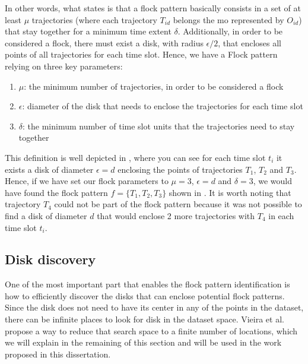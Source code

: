 In other words, what  states is that a flock pattern basically consists in a set of at least $\mu$
trajectories (where each trajectory $T_{id}$ belongs the \ac{mo} represented by $O_{id}$) that stay together for a minimum
time extent $\delta$.  Additionally, in order to be considered a flock, there must exist a disk, with radius
$\epsilon/2$, that encloses all points of all trajectories for each time slot. Hence, we have a Flock pattern relying on
three key parameters:
\begin{enumerate}
    \item $\mu$: the minimum number of trajectories, in order to be considered a flock
    \item $\epsilon$: diameter of the disk that needs to enclose the trajectories for each time slot
    \item $\delta$: the minimum number of time slot units that the trajectories need to stay together
\end{enumerate}

This definition is well depicted in , where you can see for each time slot $t_i$ it exists a disk of
diameter $\epsilon = d$ enclosing the points of trajectories $T_1$, $T_2$ and $T_3$. Hence, if we have set our flock
parameters to $\mu = 3$, $\epsilon = d$ and $\delta = 3$, we would have found the flock pattern $f = \{T_1, T_2, T_3\}$
shown in . It is worth noting that trajectory $T_4$ could not be part of the flock pattern because it
was not possible to find a disk of diameter $d$ that would enclose 2 more trajectories with $T_4$ in each time slot
$t_i$.

\subsection{Disk discovery}
\label{subsec:disk_discovery}

One of the most important part that enables the flock pattern identification is how to efficiently discover the disks
that can enclose potential flock patterns. Since the disk does not need to have its center in any of the points in the
dataset, there can be infinite places to look for disk in the dataset space. Vieira et al. \citep{vieira} propose a way
to reduce that search space to a finite number of locations, which we will explain in the remaining of this section and
will be used in the work proposed in this dissertation.

